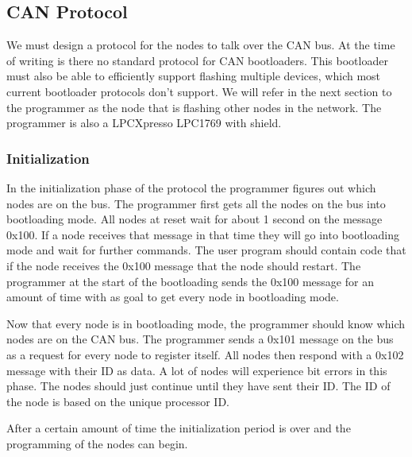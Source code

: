 \documentclass[twocolumn]{article}
\begin{document}
	
	\subsection*{CAN Protocol}
		We must design a protocol for the nodes to talk over the CAN bus.
		At the time of writing is there no standard protocol for CAN bootloaders.
		This bootloader must also be able to efficiently support flashing multiple devices,
		which most current bootloader protocols don't support.
		We will refer in the next section to the programmer as the node that is flashing other nodes in the network.
		The programmer is also a LPCXpresso LPC1769 with shield.
			
		\subsubsection*{Initialization}
			In the initialization phase of the protocol the programmer figures out which nodes are on the bus.
			The programmer first gets all the nodes on the bus into bootloading mode.
			All nodes at reset wait for about 1 second on the message 0x100.
			If a node receives that message in that time they will go into bootloading mode and wait for further commands.
			The user program should contain code that if the node receives the 0x100 message that the node should restart.
			The programmer at the start of the bootloading sends the 0x100 message for an amount of time with as goal to get every node in bootloading mode.
			
			Now that every node is in bootloading mode, the programmer should know which nodes are on the CAN bus.
			The programmer sends a 0x101 message on the bus as a request for every node to register itself.
			All nodes then respond with a 0x102 message with their ID as data.
			A lot of nodes will experience bit errors in this phase.
			The nodes should just continue until they have sent their ID.
			The ID of the node is based on the unique processor ID.
			
			After a certain amount of time the initialization period is over and the programming of the nodes can begin.
		
\end{document}

